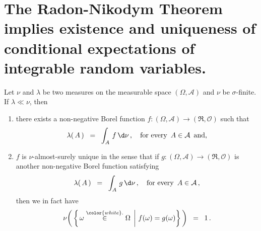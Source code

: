 

\section{The Radon-Nikodym Theorem implies existence and uniqueness of conditional expectations of integrable random variables.}
\setcounter{theorem}{0}
\setcounter{equation}{0}

\renewcommand{\theenumi}{\roman{enumi}}
\renewcommand{\labelenumi}{\textnormal{(\theenumi)}$\;\;$}


\begin{theorem}
\label{Thm:RadonNikodym}
\mbox{}
\vskip 0.2cm
\noindent
Let $\nu$ and $\lambda$ be two measures on the measurable space
$(\Omega,\mathcal{A})$ and $\nu$ be $\sigma$-finite.
If $\lambda \ll \nu$, then
\begin{enumerate}
\item
	there exists a non-negative Borel function
	$f : (\Omega,\mathcal{A}) \longrightarrow (\Re,\mathcal{O})$
	such that
	\begin{equation*}
	\lambda(\,A\,)
	\;\; = \;\;
		\int_{A}\, f \,\d\nu\,,
	\quad
	\textnormal{for every \,$A\in\mathcal{A}$\, and},
	\end{equation*}
\item
	$f$ is $\nu$-almost-surely unique in the sense that if
	$g : (\Omega,\mathcal{A}) \longrightarrow (\Re,\mathcal{O})$
	is another non-negative Borel function satisfying
	\begin{equation*}
	\lambda(\,A\,)
	\;\; = \;\;
		\int_{A}\, g \,\d\nu\,,
	\quad
	\textnormal{for every \,$A\in\mathcal{A}$}\,,
	\end{equation*}
	then we in fact have
	\begin{equation*}
	\nu\!\left(\,\left\{\left.\omega\overset{{\color{white}.}}{\in}\Omega\;\,\right\vert\,f(\omega) = g(\omega)\right\}\,\right) \;\;=\;\; 1\,.
	\end{equation*}
\end{enumerate}
\end{theorem}

